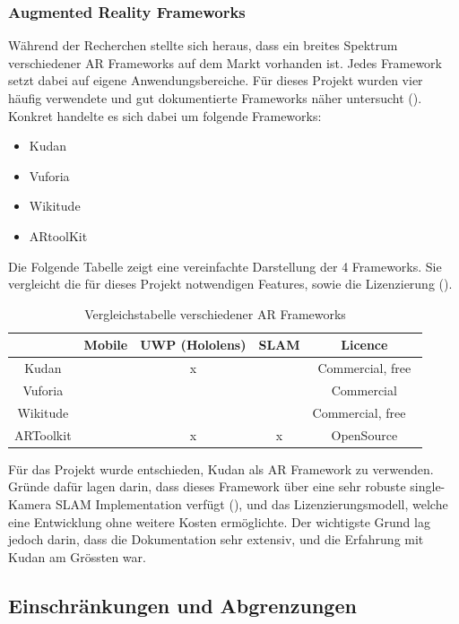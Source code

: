 \documentclass[a4paper]{scrreprt}
\begin{document}
\subsubsection{Augmented Reality Frameworks}
Während der Recherchen stellte sich heraus, dass ein breites Spektrum verschiedener AR Frameworks auf dem Markt vorhanden ist. Jedes Framework setzt dabei auf eigene Anwendungsbereiche. Für dieses Projekt wurden vier häufig verwendete und gut dokumentierte Frameworks näher untersucht (\cite{DDIDevelopment}). Konkret handelte es sich dabei um folgende Frameworks:
\begin{itemize}
\item Kudan
\item Vuforia
\item Wikitude
\item ARtoolKit
\end{itemize}

Die Folgende Tabelle zeigt eine vereinfachte Darstellung der 4 Frameworks. Sie vergleicht die für dieses Projekt notwendigen Features, sowie die Lizenzierung (\cite{DDIDevelopment}).

\begin{table}[h!]
	\center
	\begin{tabular}{|c|c|c|c|c|}
		\hline
		& \textbf{Mobile} & \textbf{UWP (Hololens)} & \textbf{SLAM} & \textbf{Licence} \\
		\hline
		Kudan & \checkmark & x & \checkmark & Commercial, free \\
		\hline
		Vuforia & \checkmark & \checkmark & \checkmark & Commercial \\
		\hline
		Wikitude & \checkmark & \checkmark & \checkmark & Commercial, free \ \\
		\hline
		ARToolkit & \checkmark & x & x & OpenSource \\
		\hline
	\end{tabular}
	\caption{Vergleichstabelle verschiedener AR Frameworks}
\end{table}


Für das Projekt wurde entschieden, Kudan als AR Framework zu verwenden. Gründe dafür lagen darin, dass dieses Framework über eine sehr robuste single-Kamera SLAM Implementation verfügt (\cite{BerfinAyhan2017}), und das Lizenzierungsmodell, welche eine Entwicklung ohne weitere Kosten ermöglichte. Der wichtigste Grund lag jedoch darin, dass die Dokumentation sehr extensiv, und die Erfahrung mit Kudan am Grössten war.

\subsection{Einschränkungen und Abgrenzungen}
\end{document}
